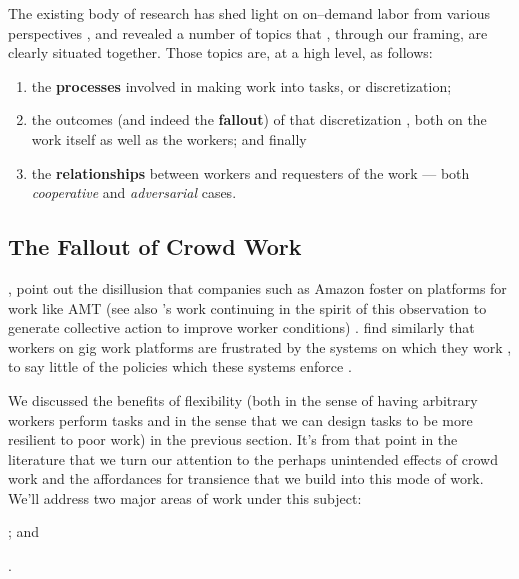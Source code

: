 \documentclass[trackingWork]{subfiles}
\begin{document}
{    %
    The existing body of research has shed light on on--demand labor from various perspectives%
,     and revealed a number of topics that%
,     through our framing, are clearly situated together.
    Those topics are, at a high level, as follows:
    \begin{enumerate}
    \item the \textbf{processes} involved in making work into tasks, or discretization;
    \item the outcomes (and indeed the \textbf{fallout}) of that discretization%
,     both on the work itself as well as the workers;
    and finally
    \item the \textbf{relationships} between workers and requesters of the work
    --- both \textit{cooperative} and \textit{adversarial} cases.
    \end{enumerate}

    \subsection{The Fallout of Crowd Work}
,     %
    \citeauthor{turkopticon} point out the disillusion that companies such as Amazon foster on platforms for work like AMT
    (see also \citeauthor{dynamo}'s work
    continuing in the spirit of this observation to generate collective action to improve worker conditions)
    \cite{turkopticon,dynamo}.
    \citeauthor{uberAlgorithm}
    find similarly that workers on gig work platforms are frustrated by the systems on which they work%
,     to say little of the policies which these systems enforce
    \cite{uberAlgorithm}.

    We discussed the benefits of flexibility
    (both in the sense of having arbitrary workers perform tasks and
    in the sense that we can design tasks to be more resilient to poor work)
    in the previous section.
    It's from that point in the literature that we turn our attention to
    the perhaps unintended effects of crowd work
    and the affordances for transience that we build into this mode of work.
    We'll address two major areas of work under this subject:
    \begin{inlinelist}
    \item {}; and
    \item {}.
    \end{inlinelist}

}
\end{document}

